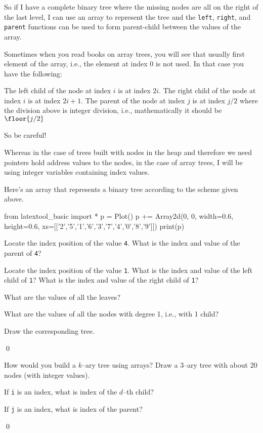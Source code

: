 So if I have a complete binary tree where
the missing nodes are all on the right of the last level,
I can use an array to represent the tree
and the \verb!left!, \verb!right!, and \verb!parent!
functions
can be used to form parent-child
between the values of the array.

Sometimes when you read books on array trees, you will see that
usually first element of the array, i.e., the element at
index 0 is not used.
In that case you have the following:
\begin{tightlist}
\li The left child of the node at index $i$ is at index $2i$.
\li The right child of the node at index $i$ is at index $2i+1$.
\li The parent of the node at index $j$ is at index $j / 2$
    where the division above is integer division, i.e., 
    mathematically it should be 
    $\floor{j / 2}$
\end{tightlist}
So be careful!

Whereas in the case of trees built with nodes in the heap
and therefore we need pointers hold address values to the nodes,
in the case of array trees, I will be using integer variables
containing index values.


\newpage
\begin{ex}
Here's an array that represents a binary tree according to the
scheme given above.

\begin{python}
from latextool_basic import *
p = Plot()
p += Array2d(0, 0, width=0.6, height=0.6, 
             xs=[['2','5','1','6','3','7','4','0','8','9']])
print(p)
\end{python}
\begin{tightlist}
  \item Locate the index position of the value \texttt{4}.
  What is the index and value of the parent of \texttt{4}?
  \item Locate the index position of the value \texttt{1}.
  What is the index and value of the left child of \texttt{1}?
  What is the index and value of the right child of \texttt{1}?
  \item What are the values of all the leaves?
  \item What are the values of all the nodes with degree 1, i.e., with 1
  child?
  \item Draw the corresponding tree.
\end{tightlist}
\qed
\end{ex}


\newpage
\begin{ex}
How would you build a $k$--ary tree using 
arrays?
Draw a $3$--ary tree with about 20 nodes (with integer values).
\begin{tightlist}
  \item If \texttt{i} is an index, what is index of the $d$--th child?
  \item If \texttt{j} is an index, what is index of the parent?
\end{tightlist}
\qed
\end{ex}
 
